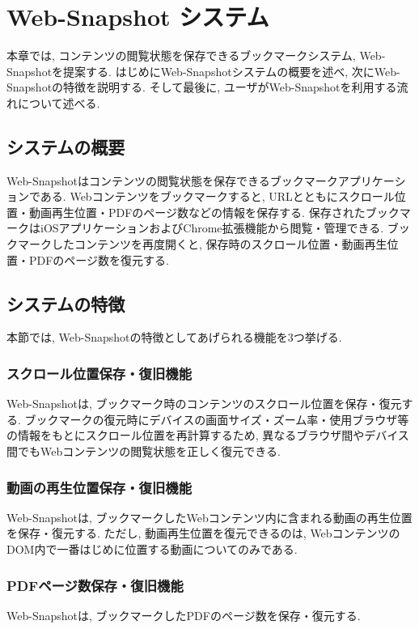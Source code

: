 \chapter{Web-Snapshot システム}
\label{chap:web_snapshot_system}
本章では, コンテンツの閲覧状態を保存できるブックマークシステム, Web-Snapshotを提案する.
はじめにWeb-Snapshotシステムの概要を述べ, 次にWeb-Snapshotの特徴を説明する.
そして最後に, ユーザがWeb-Snapshotを利用する流れについて述べる.

\section{システムの概要}
Web-Snapshotはコンテンツの閲覧状態を保存できるブックマークアプリケーションである.
Webコンテンツをブックマークすると, URLとともにスクロール位置・動画再生位置・PDFのページ数などの情報を保存する.
保存されたブックマークはiOSアプリケーションおよびChrome拡張機能から閲覧・管理できる.
ブックマークしたコンテンツを再度開くと, 保存時のスクロール位置・動画再生位置・PDFのページ数を復元する.

\section{システムの特徴}
本節では, Web-Snapshotの特徴としてあげられる機能を3つ挙げる.

\subsection{スクロール位置保存・復旧機能}
Web-Snapshotは, ブックマーク時のコンテンツのスクロール位置を保存・復元する.
ブックマークの復元時にデバイスの画面サイズ・ズーム率・使用ブラウザ等の情報をもとにスクロール位置を再計算するため, 異なるブラウザ間やデバイス間でもWebコンテンツの閲覧状態を正しく復元できる.

\subsection{動画の再生位置保存・復旧機能}
Web-Snapshotは, ブックマークしたWebコンテンツ内に含まれる動画の再生位置を保存・復元する.
ただし, 動画再生位置を復元できるのは, WebコンテンツのDOM内で一番はじめに位置する動画についてのみである.

\subsection{PDFページ数保存・復旧機能}
Web-Snapshotは, ブックマークしたPDFのページ数を保存・復元する.

